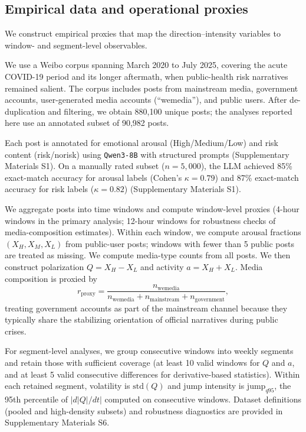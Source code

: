 \documentclass[preprint,12pt]{elsarticle}
\begin{document}
\subsection{Empirical data and operational proxies}
We construct empirical proxies that map the direction--intensity variables to window- and segment-level observables.

We use a Weibo corpus spanning March 2020 to July 2025, covering the acute COVID-19 period and its longer aftermath, when public-health risk narratives remained salient. The corpus includes posts from mainstream media, government accounts, user-generated media accounts (``wemedia''), and public users. After de-duplication and filtering, we obtain 880,100 unique posts; the analyses reported here use an annotated subset of 90,982 posts.

Each post is annotated for emotional arousal (High/Medium/Low) and risk content (risk/norisk) using \texttt{Qwen3-8B} \cite{Qwen3_8B} with structured prompts (Supplementary Materials S1). On a manually rated subset ($n=5{,}000$), the LLM achieved 85\% exact-match accuracy for arousal labels (Cohen's $\kappa=0.79$) and 87\% exact-match accuracy for risk labels ($\kappa=0.82$) (Supplementary Materials S1).

We aggregate posts into time windows and compute window-level proxies (4-hour windows in the primary analysis; 12-hour windows for robustness checks of media-composition estimates). Within each window, we compute arousal fractions $(X_H,X_M,X_L)$ from public-user posts; windows with fewer than 5 public posts are treated as missing. We compute media-type counts from all posts. We then construct polarization $Q=X_H-X_L$ and activity $a=X_H+X_L$. Media composition is proxied by
\begin{equation}
r_{\text{proxy}}=\frac{n_{\text{wemedia}}}{n_{\text{wemedia}}+n_{\text{mainstream}}+n_{\text{government}}},
\label{eq:rproxy}
\end{equation}
treating government accounts as part of the mainstream channel because they typically share the stabilizing orientation of official narratives during public crises.

For segment-level analyses, we group consecutive windows into weekly segments and retain those with sufficient coverage (at least 10 valid windows for $Q$ and $a$, and at least 5 valid consecutive differences for derivative-based statistics). Within each retained segment, volatility is $\text{std}(Q)$ and jump intensity is $\text{jump}_{q95}$, the 95th percentile of $|d|Q|/dt|$ computed on consecutive windows. Dataset definitions (pooled and high-density subsets) and robustness diagnostics are provided in Supplementary Materials S6.
\end{document}
